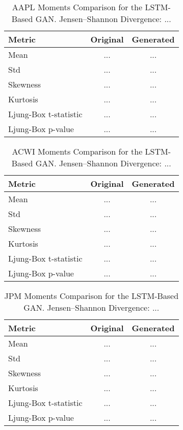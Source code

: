 \documentclass{article}
\begin{document}
\begin{table}[h!]
\centering
\begin{tabular}{lcc}
\hline
\textbf{Metric} & \textbf{Original} & \textbf{Generated} \\
\hline
Mean     & ... & ... \\
Std      & ... & ... \\
Skewness & ... & ... \\
Kurtosis & ... & ... \\
Ljung-Box t-statistic & ... & ... \\
Ljung-Box p-value & ... & ... \\
\hline
\end{tabular}
\caption{AAPL Moments Comparison for the LSTM-Based GAN.
Jensen--Shannon Divergence: ...}
\label{tab:aapl_attention}
\end{table}

\begin{table}[h!]
\centering
\begin{tabular}{lcc}
\hline
\textbf{Metric} & \textbf{Original} & \textbf{Generated} \\
\hline
Mean     & ... & ... \\
Std      & ... & ... \\
Skewness & ... & ... \\
Kurtosis & ... & ... \\
Ljung-Box t-statistic & ... & ... \\
Ljung-Box p-value & ... & ... \\
\hline
\end{tabular}
\caption{ACWI Moments Comparison for the LSTM-Based GAN.
Jensen--Shannon Divergence: ...}
\label{tab:acwi_lstm}
\end{table}

\begin{table}[h!]
\centering
\begin{tabular}{lcc}
\hline
\textbf{Metric} & \textbf{Original} & \textbf{Generated} \\
\hline
Mean     & ... & ... \\
Std      & ... & ... \\
Skewness & ... & ... \\
Kurtosis & ... & ... \\
Ljung-Box t-statistic & ... & ... \\
Ljung-Box p-value & ... & ... \\
\hline
\end{tabular}
\caption{JPM Moments Comparison for the LSTM-Based GAN.
Jensen--Shannon Divergence: ...}
\label{tab:jpm_lstm}
\end{table}
\end{document}
